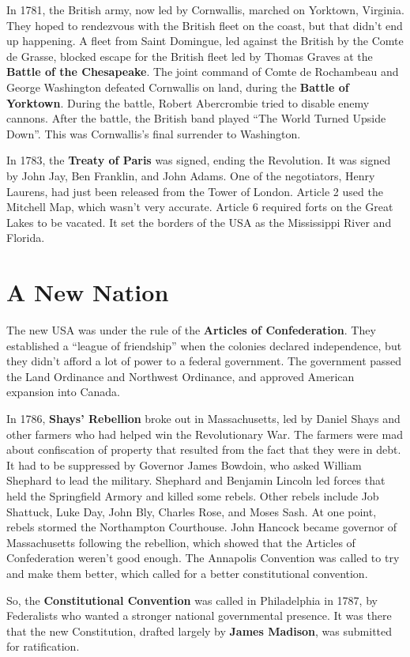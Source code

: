 In 1781, the British army, now led by Cornwallis, marched on Yorktown, Virginia.
They hoped to rendezvous with the British fleet on the coast,
but that didn't end up happening.
A fleet from Saint Domingue, led against the British by the Comte de Grasse, blocked escape for the
British fleet led by Thomas Graves at the \textbf{Battle of the Chesapeake}.
The joint command of Comte de Rochambeau and George Washington defeated Cornwallis
on land, during the \textbf{Battle of Yorktown}.
During the battle, Robert Abercrombie tried to disable enemy cannons.
After the battle, the British band played ``The World Turned Upside Down''.
This was Cornwallis's final surrender to Washington.

In 1783, the \textbf{Treaty of Paris} was signed, ending the Revolution.
It was signed by John Jay, Ben Franklin, and John Adams.
One of the negotiators, Henry Laurens, had just been released from the Tower of London.
Article 2 used the Mitchell Map, which wasn't very accurate.
Article 6 required forts on the Great Lakes to be vacated.
It set the borders of the USA as the Mississippi River and Florida.

\section{A New Nation}

The new USA was under the rule of the \textbf{Articles of Confederation}.
They established a ``league of friendship'' when the colonies declared independence,
but they didn't afford a lot of power to a federal government.
The government passed the Land Ordinance and Northwest Ordinance,
and approved American expansion into Canada.

In 1786, \textbf{Shays' Rebellion} broke out in Massachusetts,
led by Daniel Shays and other farmers who had helped win the Revolutionary War.
The farmers were mad about confiscation of property that resulted from the fact that they were in debt.
It had to be suppressed by Governor James Bowdoin, who asked William Shephard to lead the military.
Shephard and Benjamin Lincoln led forces that held the Springfield Armory and killed some rebels.
Other rebels include Job Shattuck, Luke Day, John Bly, Charles Rose, and Moses Sash.
At one point, rebels stormed the Northampton Courthouse.
John Hancock became governor of Massachusetts following the rebellion,
which showed that the Articles of Confederation weren't good enough.
The Annapolis Convention was called to try and make them better,
which called for a better constitutional convention.

So, the \textbf{Constitutional Convention} was called in Philadelphia in 1787,
by Federalists who wanted a stronger national governmental presence.
It was there that the new Constitution, drafted largely by \textbf{James Madison},
was submitted for ratification.

